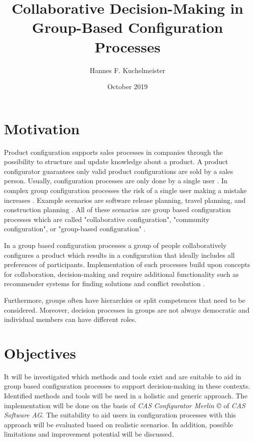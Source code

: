 \documentclass[a4paper]{IEEEtran}
\title{Collaborative Decision-Making in Group-Based Configuration Processes}
\author{Hannes F. Kuchelmeister}
\date{October 2019}
\begin{document}
\maketitle

\section{Motivation}

Product configuration supports sales processes in companies through the possibility to structure and update knowledge about a product. A product configurator guarantees only valid product configurations are sold by a sales person. Usually, configuration processes are only done by a single user \cite{felferningGroupBasedConfiguration2016, velasquez-guevaraMultiSPLOTSupportingMultiuser2018a}.
In complex group configuration processes the risk of a single user making a mistake increases \cite{felfernigGroupDecisionSupport2011}.
Example scenarios are software release planning, travel planning, and construction planning \cite{felfernigOpenConfiguration2014}. 
All of these scenarios are group based configuration processes which are called "collaborative configuration", "community configuration", or "group-based configuration" \cite{felferningGroupBasedConfiguration2016, felfernigOpenConfiguration2014,mendoncaCollaborativeProductConfiguration2008,felfernigKnowledgebasedConfigurationResearch2014}.

In a group based configuration processes a group of people collaboratively configures a product which results in a configuration that ideally includes all preferences of participants. Implementation of such processes build upon concepts for collaboration, decision-making and require additional functionality such as recommender systems for finding solutions and conflict resolution \cite{felfernigKnowledgebasedConfigurationResearch2014}.


Furthermore, groups often have hierarchies or split competences that need to be considered. Moreover, decision processes in groups are not always democratic and individual members can have different roles.

\section{Objectives}

It will be investigated which methods and tools exist and are suitable to aid in group based configuration processes to support decision-making in these contexts. Identified methods and tools will be used in a holistic and generic approach. 
The implementation will be done on the basis of \emph{CAS Configurator Merlin \copyright} of \emph{CAS Software AG}. The suitability to aid users in configuration processes with this approach will be evaluated based on realistic scenarios. In addition, possible limitations and improvement potential will be discussed.
\end{document}
